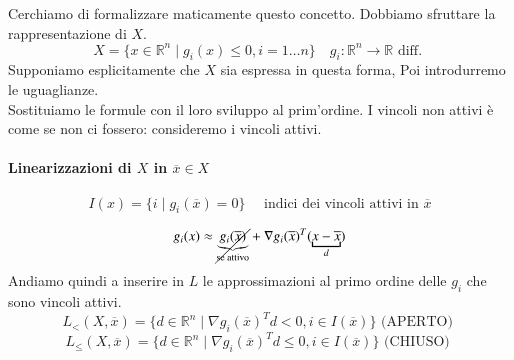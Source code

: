 Cerchiamo di formalizzare maticamente questo concetto.
Dobbiamo sfruttare la rappresentazione di $X$.
$$ X  = \{x \in \mathbb{R}^{n} \; | \; g_i(x) \leq 0 , i = 1 \ldots n \}
\quad g_i: \mathbb{R}^{n} \rightarrow \mathbb{R} \text{ diff. }
$$
Supponiamo esplicitamente che $X$ sia espressa in questa forma,
Poi introdurremo le uguaglianze. \\
Sostituiamo le formule con il loro sviluppo al prim'ordine.
I  vincoli non attivi \`e come se non ci fossero: consideremo i
vincoli attivi.
\paragraph{Linearizzazioni di $X$ in $\overline{x} \in X$}

$$I(x) = \{ i \; | \; g_i(\overline{x}) = 0 \}
\quad \text{ indici dei vincoli attivi in } \overline{x}
$$

$$ g_i(x) \approx \cancel{\underbrace{g_i(\overline{x})}_{\text{se attivo}}} + \nabla g_i(\overline{x})^{T}(\underbracket{x-\overline{x}}_{d})$$
Andiamo quindi a inserire in $L$ le approssimazioni al primo
ordine delle $g_i$ che sono vincoli attivi.
$$L_{<}(X, \overline{x}) = \{ d \in \mathbb{R}^{n} \; | \;
\nabla g_i(\overline{x})^{T}d < 0, i \in I(\overline{x}) \} \text{ (APERTO) } $$
$$L_{\leq}(X, \overline{x}) = \{ d \in \mathbb{R}^{n} \; | \;
\nabla g_i(\overline{x})^{T}d \leq 0, i \in I(\overline{x}) \} \text{ (CHIUSO) } $$

